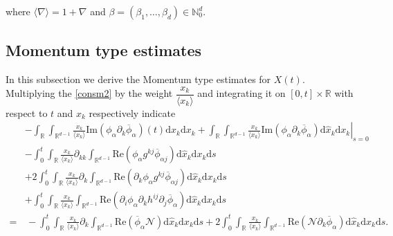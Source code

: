 \documentclass[10pt,twoside,a4paper]{article}
\numberwithin{equation}{section}\allowdisplaybreaks
\begin{document}
where $ \langle \nabla \rangle =1+\nabla $ and $ \beta=(\beta_1,\dots,\beta_d) \in \mathbb{N}^d_0 $.




\subsection{Momentum type estimates} \label{s3.1}
In this subsection we derive the Momentum type estimates for $ X(t) $.  Multiplying the \eqref{consm2} by the weight $ \dfrac{x_k}{\langle x_k\rangle} $ and integrating it on $ [0,t]\times\mathbb{R} $ with respect to $t$ and  $ x_k $ respectively indicate
\begin{align} \label{qener_mc1}
	&-	\int_{\mathbb{R}}  \int_{\mathbb{R}^{d-1}} \frac{x_k}{\langle x_k\rangle}   \mathrm{Im}\left( \phi_{\alpha } \partial_k \overline{\phi}_\alpha \right)(t) \mathrm{d} \hat{x}_k \mathrm{d} x_k+	\left.\int_{\mathbb{R}}  \int_{\mathbb{R}^{d-1}} \frac{x_k}{\langle x_k\rangle}   \mathrm{Im}\left( \phi_{\alpha } \partial_k \overline{\phi}_\alpha \right) \mathrm{d} \hat{x}_k \mathrm{d} x_k\right|_{s=0}\nonumber\\
	&- \int_0^t \int_{\mathbb{R}}   	\frac{x_k}{\langle x_k\rangle}   \partial_{kk} \int_{\mathbb{R}^{d-1}} \mathrm{Re}\left( \phi_{\alpha }  g^{kj} \overline{\phi}_{\alpha j}\right) \mathrm{d} \hat{x}_k   \mathrm{d} x_k \mathrm{d} s\nonumber \\
	&+2  \int_0^t\int_{\mathbb{R}}    	\frac{x_k}{\langle x_k\rangle}   \partial_k \int_{\mathbb{R}^{d-1}} \mathrm{Re}\left(\partial_k \phi_{\alpha } g^{kj} \overline{\phi}_{\alpha j}\right) \mathrm{d} \hat{x}_k  \mathrm{d} x_k \mathrm{d} s \\
	&+ \int_0^t	\int_{\mathbb{R}}\frac{x_k}{\langle x_k\rangle}   \int_{\mathbb{R}^{d-1}}  \mathrm{Re}\left(\partial_{i} \phi_{\alpha }  \partial_k h^{ij} \partial_j \overline{\phi}_{\alpha }\right) \mathrm{d} \hat{x}_k  \mathrm{d} x_k \mathrm{d} s \nonumber\\
	=&\,- \int_0^t	\int_{\mathbb{R}}\frac{x_k}{\langle x_k\rangle}   \partial_k\int_{\mathbb{R}^{d-1}}   \mathrm{Re}\left( \overline{\phi }_{\alpha } \mathcal{N}\right) \mathrm{d} \hat{x}_k  \mathrm{d} x_k \mathrm{d} s+2\int_0^t	\int_{\mathbb{R}}\frac{x_k}{\langle x_k\rangle}  \int_{\mathbb{R}^{d-1}}  \mathrm{Re} \left(\mathcal{N} \partial_k \overline{\phi}_\alpha\right)   \mathrm{d} \hat{x}_k  \mathrm{d} x_k \mathrm{d} s\nonumber.
\end{align}
\end{document}
